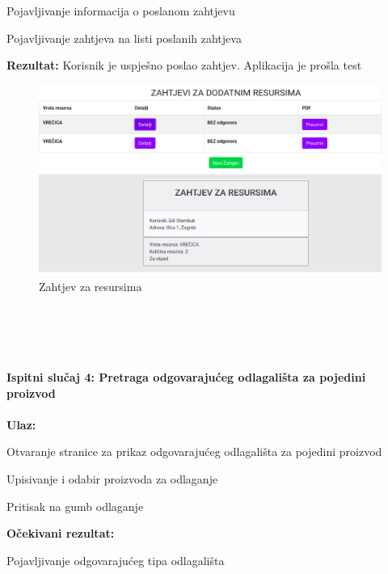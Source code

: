 			\begin{packed_enum}
				\item{Pojavljivanje informacija o poslanom zahtjevu}
				\item{Pojavljivanje zahtjeva na listi poslanih zahtjeva}
			\end{packed_enum}
			
			\textbf{Rezultat:} Korisnik je uspješno poslao zahtjev. Aplikacija je prošla test
			
			\begin{figure}[H]
				\includegraphics[scale=0.3]{slike/Zahtjev_resursi.png}
				\centering
				\caption{Zahtjev za resursima}
				\label{fig:Zahtjev_resursi}
			\end{figure}
			
			\text{}\\\\
			\text{}\\\\
		
			\textbf{Ispitni slučaj 4: Pretraga odgovarajućeg odlagališta za pojedini proizvod}
			\text{}\\\\
			
			\textbf{Ulaz:}
			
			\begin{packed_enum}
				\item{Otvaranje stranice za prikaz odgovarajućeg odlagališta za pojedini proizvod}
				\item{Upisivanje i odabir proizvoda za odlaganje}
				\item{Pritisak na gumb odlaganje}
			\end{packed_enum}
			
			\textbf{Očekivani rezultat:}
			
			\begin{packed_enum}
				\item{Pojavljivanje odgovarajućeg tipa odlagališta}
			\end{packed_enum}
			
